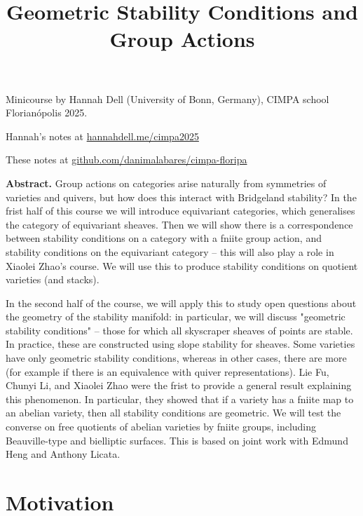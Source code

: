 


\title{Geometric Stability Conditions and Group Actions}
\maketitle

\noindent
Minicourse by Hannah Dell (University of Bonn, Germany), CIMPA school
Florianópolis 2025.

\medskip\noindent
Hannah's notes at \href{https://www.hannahdell.me/cimpa2025}
{hannahdell.me/cimpa2025}

\medskip\noindent
These notes at 
\href{http://github.com/danimalabares/cimpa-floripa}
{github.com/danimalabares/cimpa-floripa}

\bigskip\noindent

{\bf Abstract.} Group actions on categories arise naturally from symmetries of
varieties and quivers, but how does this interact with Bridgeland stability? In
the frist half of this course we will introduce equivariant categories, which
generalises the category of equivariant sheaves. Then we will show there is a
correspondence between stability conditions on a category with a fniite group
action, and stability conditions on the equivariant category – this will also
play a role in Xiaolei Zhao’s course. We will use this to produce stability
conditions on quotient varieties (and stacks).

In the second half of the course, we will apply this to study open questions
about the geometry of the stability manifold: in particular, we will discuss
"geometric stability conditions" – those for which all skyscraper sheaves of
points are stable. In practice, these are constructed using slope stability for
sheaves. Some varieties have only geometric stability conditions, whereas in
other cases, there are more (for example if there is an equivalence with quiver
representations). Lie Fu, Chunyi Li, and Xiaolei Zhao were the frist to provide
a general result explaining this phenomenon. In particular, they showed that if
a variety has a fniite map to an abelian variety, then all stability conditions
are geometric. We will test the converse on free quotients of abelian varieties
by fniite groups, including Beauville-type and bielliptic surfaces. This is
based on joint work with Edmund Heng and Anthony Licata. 

\bigskip\noindent
\tableofcontents
\bigskip\noindent

\section*{Motivation}
\label{section-motivation}

